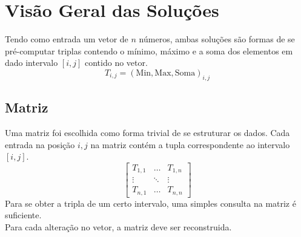 \documentclass{article}
\begin{document}
\section{Visão Geral das Soluções}
Tendo como entrada um vetor de $n$ números, ambas soluções são formas de se pré-computar triplas contendo o mínimo, máximo e a soma dos elementos em dado intervalo $[i, j]$ contido no vetor.
\[ T_{i,j} = {(\text{Min}, \text{Max}, \text{Soma})}_{i,j} \]

\subsection{Matriz}
Uma matriz foi escolhida como forma trivial de se estruturar os dados. Cada entrada na posição $i, j$ na matriz contém a tupla correspondente ao intervalo $[i,j]$.
\[
  \begin{bmatrix}
      T_{1,1} & \hdots  & T_{1,n} \\
      \vdots & \ddots  & \vdots \\
      T_{n,1} & \hdots & T_{n,n}
  \end{bmatrix}
\]
Para se obter a tripla de um certo intervalo, uma simples consulta na matriz é suficiente. \\
Para cada alteração no vetor, a matriz deve ser reconstruida.
\end{document}
